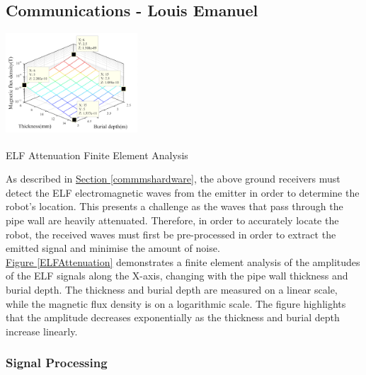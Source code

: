 \documentclass[11pt]{article}		%
\newcommand{\supercite}[1]{\textsuperscript{\cite{#1}}}		%
\newcommand{\figref}[1]{\hyperref[#1]{Figure \ref*{#1}}}    %
\newcommand{\sectref}[1]{\hyperref[#1]{Section \ref*{#1}}}     %
\begin{document}
		\subsection[Communications]{Communications - Louis Emanuel}
		    
		    \begin{floatingfigure}[r]{0.4\textwidth}
				\centering
				\includegraphics[width = 0.37\textwidth]{Attenuation}
				\caption{ELF Attenuation Finite Element Analysis\supercite{FDT}}
				\label{ELFAttenuation}
			\end{floatingfigure}
            \hspace*{2ex}As described in \sectref{commmshardware}, the above ground receivers must detect the ELF electromagnetic waves from the emitter in order to determine the robot's location.
			This presents a challenge as the waves that pass through the pipe wall are heavily attenuated. 
			Therefore, in order to accurately locate the robot, the received waves must first be pre-processed in order to extract the emitted signal and minimise the amount of noise.
			\\	    
		    \hspace*{2ex}\figref{ELFAttenuation} demonstrates a finite element analysis of the amplitudes of the ELF signals along the X-axis, changing with the pipe wall thickness and burial depth.
		    The thickness and burial depth are measured on a linear scale, while the magnetic flux density is on a logarithmic scale.
		    The figure highlights that the amplitude decreases exponentially as the thickness and burial depth increase linearly.

			\subsubsection{Signal Processing}
			
		    \begin{floatingfigure}[r]{0pt} \end{floatingfigure}
		    
\end{document}
